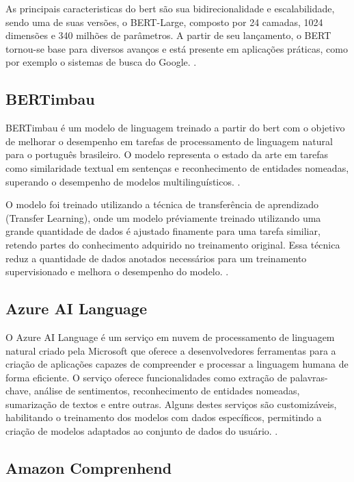 As principais caracteristicas do \gls{bert} são sua bidirecionalidade e escalabilidade, sendo uma de suas versões, o BERT-Large, composto por 24 camadas, 1024 dimensões e 340 milhões de parâmetros. A partir de seu lançamento, o BERT tornou-se base para diversos avanços e está presente em aplicações práticas, como por exemplo o sistemas de busca do Google. \cite{Devlin2018}.

\subsection{BERTimbau}\label{subsec:bertimbau}

BERTimbau é um modelo de linguagem treinado a partir do \gls{bert} com o objetivo de melhorar o desempenho em tarefas de processamento de linguagem natural para o português brasileiro. O modelo representa o estado da arte em tarefas como similaridade textual em sentenças e reconhecimento de entidades nomeadas, superando o desempenho de modelos multilinguísticos. \cite{souza2020bertimbau}.

O modelo foi treinado utilizando a técnica de transferência de aprendizado (Transfer Learning), onde um modelo préviamente treinado utilizando uma grande quantidade de dados é ajustado finamente para uma tarefa similiar, retendo partes do conhecimento adquirido no treinamento original. Essa técnica reduz a quantidade de dados anotados necessários para um treinamento supervisionado e melhora o desempenho do modelo. \cite{souza2020bertimbau}.

\subsection{Azure AI Language}\label{subsec:azure}

O Azure AI Language é um serviço em nuvem de processamento de linguagem natural criado pela Microsoft que oferece a desenvolvedores ferramentas para a criação de aplicações capazes de compreender e processar a linguagem humana de forma eficiente. O serviço oferece funcionalidades como extração de palavras-chave, análise de sentimentos, reconhecimento de entidades nomeadas, sumarização de textos e entre outras. Alguns destes serviços são customizáveis, habilitando o treinamento dos modelos com dados específicos, permitindo a criação de modelos adaptados ao conjunto de dados do usuário. \cite{AzureAILanguage}.

\subsection{Amazon Comprenhend}\label{subsec:comprehend}

